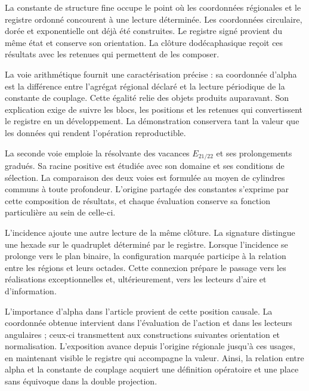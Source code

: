 
La constante de structure fine occupe le point où les coordonnées
régionales et le registre ordonné concourent à une lecture déterminée.
Les coordonnées circulaire, dorée et exponentielle ont déjà été construites.
Le registre signé provient du même état et conserve son orientation.
La clôture dodécaphasique reçoit ces résultats avec les retenues qui
permettent de les composer.

La voie arithmétique fournit une caractérisation précise : sa coordonnée
d’alpha est la différence entre l’agrégat régional déclaré et la
lecture périodique de la constante de couplage. Cette égalité relie
des objets produits auparavant. Son explication exige de suivre les blocs,
les positions et les retenues qui convertissent le registre en un développement.
La démonstration conservera tant la valeur que les données qui rendent
l’opération reproductible.

La seconde voie emploie la résolvante des vacances \(E_{21/22}\) et ses prolongements gradués. Sa racine positive est étudiée avec son domaine et ses conditions de sélection. La comparaison des deux voies est formulée au moyen de cylindres communs à toute profondeur. L'origine partagée des constantes s'exprime par cette composition de résultats, et chaque évaluation conserve sa fonction particulière au sein de celle-ci.

L’incidence ajoute une autre lecture de la même clôture. La signature distingue
une hexade sur le quadruplet déterminé par le registre. Lorsque
l’incidence se prolonge vers le plan binaire, la configuration marquée
participe à la relation entre les régions et leurs octades. Cette
connexion prépare le passage vers les réalisations exceptionnelles et,
ultérieurement, vers les lecteurs d’aire et d’information.

L’importance d’alpha dans l’article provient de cette position causale. La
coordonnée obtenue intervient dans l’évaluation de l’action et dans les
lecteurs angulaires ; ceux-ci transmettent aux constructions suivantes
orientation et normalisation. L’exposition avance depuis l’origine
régionale jusqu’à ces usages, en maintenant visible le registre qui accompagne
la valeur. Ainsi, la relation entre alpha et la constante de couplage
acquiert une définition opératoire et une place sans équivoque dans la double
projection.
